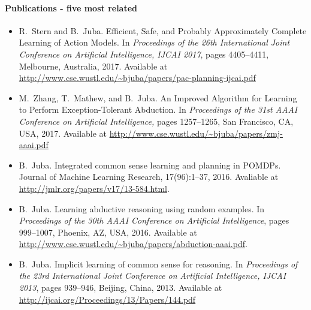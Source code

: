 \documentclass[12pt]{article}
\begin{document}
\paragraph{Publications - five most related}
\begin{itemize}
  \item  R.~Stern and B.~Juba.
    \newblock Efficient, Safe, and Probably Approximately Complete Learning of 
              Action Models.
    \newblock In {\em Proceedings of the 26th International Joint Conference on
              Artificial Intelligence, IJCAI 2017}, pages 4405--4411, Melbourne,
              Australia, 2017. 
    \newblock Available at     \url{http://www.cse.wustl.edu/~bjuba/papers/pac-planning-ijcai.pdf}

  \item M.~Zhang, T.~Mathew, and B.~Juba.
    \newblock An Improved Algorithm for Learning to Perform Exception-Tolerant
              Abduction.
    \newblock In {\em Proceedings of the 31st AAAI Conference on Artificial
              Intelligence,} pages 1257--1265, San Francisco, CA, USA, 2017.
    \newblock Available at
      \url{http://www.cse.wustl.edu/~bjuba/papers/zmj-aaai.pdf}
  
  \item B.~Juba.
    \newblock Integrated common sense learning and planning in {POMDPs}.
    \newblock Journal of Machine Learning Research, 17(96):1--37, 2016.
    \newblock Avaliable at 
      \url{http://jmlr.org/papers/v17/13-584.html}.

 \item B.~Juba.
    \newblock Learning abductive reasoning using random examples.
    \newblock In {\em Proceedings of the 30th AAAI Conference on Artificial
              Intelligence}, pages 999--1007, Phoenix, AZ, USA, 2016.
    \newblock Available at \url{http://www.cse.wustl.edu/~bjuba/papers/abduction-aaai.pdf}.

  \item B.~Juba.
    \newblock Implicit learning of common sense for reasoning.
    \newblock In {\em Proceedings of the 23rd International Joint Conference on 
              Artificial Intelligence, IJCAI 2013}, pages 939--946, Beijing, China, 2013.
    \newblock Available at \url{http://ijcai.org/Proceedings/13/Papers/144.pdf}
\end{itemize}
\end{document}
